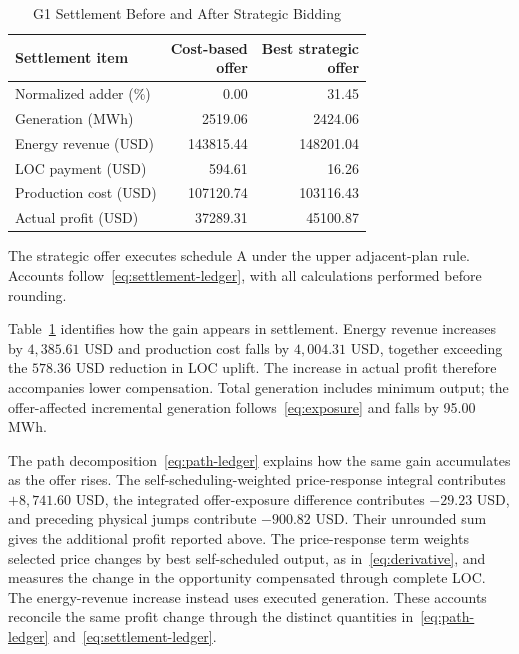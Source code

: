 \documentclass[journal]{IEEEtran}
\begin{document}
\begin{table}[t]
\centering\caption{G1 Settlement Before and After Strategic Bidding}\label{tab:settlement}
\setlength{\tabcolsep}{4pt}
\begin{tabular}{@{}lrr@{}}\toprule
Settlement item & \shortstack{Cost-based\\offer} & \shortstack{Best strategic\\offer}\\\midrule
Normalized adder (\%) & 0.00 & 31.45\\
Generation (MWh) & 2519.06 & 2424.06\\
Energy revenue (USD) & 143815.44 & 148201.04\\
LOC payment (USD) & 594.61 & 16.26\\
Production cost (USD) & 107120.74 & 103116.43\\
Actual profit (USD) & 37289.31 & 45100.87\\
\bottomrule\end{tabular}
\vspace{2pt}\parbox{\columnwidth}{\footnotesize The strategic offer executes schedule A under the upper adjacent-plan rule. Accounts follow~\eqref{eq:settlement-ledger}, with all calculations performed before rounding.}
\end{table}

Table~\ref{tab:settlement} identifies how the gain appears in settlement. Energy revenue increases by $4{,}385.61$ USD and production cost falls by $4{,}004.31$ USD, together exceeding the $578.36$ USD reduction in LOC uplift. The increase in actual profit therefore accompanies lower compensation. Total generation includes minimum output; the offer-affected incremental generation follows~\eqref{eq:exposure} and falls by 95.00 MWh.

The path decomposition~\eqref{eq:path-ledger} explains how the same gain accumulates as the offer rises. The self-scheduling-weighted price-response integral contributes $+8{,}741.60$ USD, the integrated offer-exposure difference contributes $-29.23$ USD, and preceding physical jumps contribute $-900.82$ USD. Their unrounded sum gives the additional profit reported above. The price-response term weights selected price changes by best self-scheduled output, as in~\eqref{eq:derivative}, and measures the change in the opportunity compensated through complete LOC. The energy-revenue increase instead uses executed generation. These accounts reconcile the same profit change through the distinct quantities in~\eqref{eq:path-ledger} and~\eqref{eq:settlement-ledger}.
\end{document}

